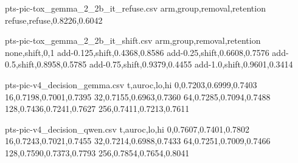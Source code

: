 \begin{filecontents*}[overwrite]{pts-pic-tox_gemma_2_2b_it_refuse.csv}
arm,group,removal,retention
refuse,refuse,0.8226,0.6042
\end{filecontents*}
\begin{filecontents*}[overwrite]{pts-pic-tox_gemma_2_2b_it_shift.csv}
arm,group,removal,retention
none,shift,0,1
add-0.125,shift,0.4368,0.8586
add-0.25,shift,0.6608,0.7576
add-0.5,shift,0.8958,0.5785
add-0.75,shift,0.9379,0.4455
add-1.0,shift,0.9601,0.3414
\end{filecontents*}
\begin{filecontents*}[overwrite]{pts-pic-v4_decision_gemma.csv}
t,auroc,lo,hi
0,0.7203,0.6999,0.7403
16,0.7198,0.7001,0.7395
32,0.7155,0.6963,0.7360
64,0.7285,0.7094,0.7488
128,0.7436,0.7241,0.7627
256,0.7411,0.7213,0.7611
\end{filecontents*}
\begin{filecontents*}[overwrite]{pts-pic-v4_decision_qwen.csv}
t,auroc,lo,hi
0,0.7607,0.7401,0.7802
16,0.7243,0.7021,0.7455
32,0.7214,0.6988,0.7433
64,0.7251,0.7009,0.7466
128,0.7590,0.7373,0.7793
256,0.7854,0.7654,0.8041
\end{filecontents*}
